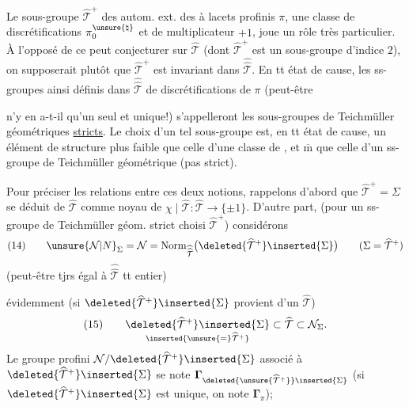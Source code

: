 Le sous-groupe $\widehat{\mathcal{T}}^{+}$ des autom. ext. des
 à lacets profinis $\pi$,
 une classe de discrétifications
$\pi_0^{\unsure{\natural}}$ et de multiplicateur $+1$, joue un rôle très particulier.
À l'opposé de ce  peut conjecturer sur $\widehat{\mathcal{T}}$
(dont $\widehat{\mathcal{T}}^{+}$ est un sous-groupe  d'indice $2$),
on supposerait plutôt que $\widehat{\mathcal{T}}^{+}$ est invariant dans
$\widehat{\widehat{\mathcal{T}}}$. En tt état de cause,
les ss-groupes ainsi définis dans $\widehat{\widehat{\mathcal{T}}}$
  de discrétifications de $\pi$
 (peut-être



n'y en a-t-il qu'un seul et unique!) s'appelleront les sous-groupes de Teichmüller géométriques \uline{stricts}. Le choix d'un tel sous-groupe  est, en tt état de cause, un élément de structure  plus faible que celle d'une classe de , et $\overline{\mathrm m}$ que celle d'un ss-groupe de Teichmüller géométrique (pas strict).

Pour préciser les relations entre ces deux notions, rappelons d'abord que $\widehat{\mathcal{T}}^{+}=\Sigma$ se déduit de $\widehat{\mathcal{T}}$ comme noyau de $\chi\mid\widehat{\mathcal{T}}:\widehat{\mathcal{T}}\longrightarrow\{\pm1\}$. D'autre part,  (pour un ss-groupe de Teichmüller géom. strict choisi $\widehat{\mathcal{T}}^{+}$) considérons
\[
(14)\qquad
\unsure{\mathcal{N}|N}_{\Sigma}=\mathcal{N}
=\operatorname{Norm}_{\widehat{\widehat{\mathcal{T}}}}
\bigl(\deleted{\widehat{\mathcal{T}}^{+}}\inserted{\Sigma}\bigr)
\qquad (\Sigma=\widehat{\mathcal{T}}^{+})
\]
(peut-être tjrs égal à $\widehat{\widehat{\mathcal{T}}}$ tt entier)

évidemment (si $\deleted{\widehat{\mathcal{T}}^{+}}\inserted{\Sigma}$ provient d'un $\widehat{\mathcal{T}}$)
\[
(15)\qquad
\underset{\inserted{\unsure{=}\widehat{\mathcal{T}}^{+}}}
{\deleted{\widehat{\mathcal{T}}^{+}}\inserted{\Sigma}}
\subset\widehat{\mathcal{T}}\subset\mathcal{N}_{\Sigma}.
\]
Le groupe profini $\mathcal{N}/\deleted{\widehat{\mathcal{T}}^{+}}\inserted{\Sigma}$
 associé à 
$\deleted{\widehat{\mathcal{T}}^{+}}\inserted{\Sigma}$ se note
$\boldsymbol{\Gamma}_{\deleted{\unsure{\widehat{\mathcal{T}}^{+}}}\inserted{\Sigma}}$
 
(si $\deleted{\widehat{\mathcal{T}}^{+}}\inserted{\Sigma}$ est unique, on note $\boldsymbol{\Gamma}_{\pi}$);


